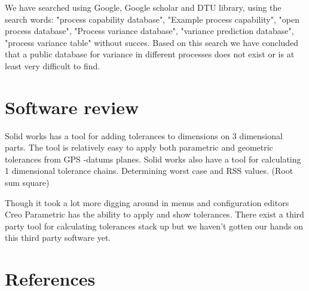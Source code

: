 \documentclass[aip,amsmath,reprint, author-year]{revtex4-1}
\begin{document}
We have searched using Google, Google scholar and DTU library, using the search words: "process capability database", "Example process capability", "open process database", "Process variance database", "variance prediction database", "process variance table" without succes. 
Based on this search we have concluded that a public database for variance in different processes does not exist or is at least very difficult to find.

\section{Software review}
Solid works has a tool for adding tolerances to dimensions on 3 dimensional parts.
The tool is relatively easy to apply both parametric and geometric tolerances from GPS -datums planes. 
Solid works also have a tool for calculating 1 dimensional tolerance chains. 
Determining worst case and RSS values. (Root sum square)

Though it took a lot more digging around in menus and configuration editors Creo Parametric has the ability to apply and show tolerances. There exist a third party tool for calculating tolerances stack up but we haven't gotten our hands on this third party software yet.



\section*{References}

\end{document}
